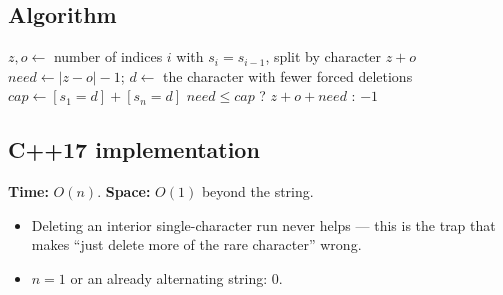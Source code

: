 \subsection*{Algorithm}
\begin{algorithmic}[1]
\State $z,o\gets$ number of indices $i$ with $s_i=s_{i-1}$, split by character
 \Return $z+o$ \EndIf
\State $need\gets|z-o|-1$; $d\gets$ the character with fewer forced deletions
\State $cap\gets[s_1=d]+[s_n=d]$
\State \Return $need\le cap$ ? $z+o+need$ : $-1$
\end{algorithmic}


\subsection*{C++17 implementation}

\begin{complexitybox}
\textbf{Time:} $O(n)$. \textbf{Space:} $O(1)$ beyond the string.
\end{complexitybox}

\begin{pitfallbox}
\begin{itemize}
  \item Deleting an interior single-character run never helps --- this is
        the trap that makes ``just delete more of the rare character'' wrong.
  \item $n=1$ or an already alternating string: $0$.
\end{itemize}
\end{pitfallbox}
